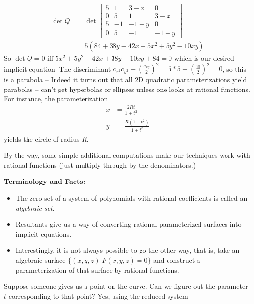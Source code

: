 \begin{numerical-example}
  \begin{align*}
    \det Q &= \det
             \begin{bmatrix}
               5 & 1 & 3 - x & 0 \\
               0 & 5 & 1 & 3-x \\
               5 & -1 & -1-y & 0 \\
               0 & 5 & -1 & -1-y
             \end{bmatrix} \\
    &= 5(84 + 38y - 42x + 5x^2 + 5y^2 - 10xy)
  \end{align*}
  So $\det Q = 0$ iff $5x^2 + 5y^2 - 42x + 38y - 10xy + 84 = 0$ which
  is our desired implicit equation. The discriminant $c_{x^2}c_{y^2} -
  (\frac{c_{xy}}{2})^2 = 5 * 5 - (\frac{10}{2})^2 = 0$, so this is a
  parabola -- Indeed it turns out that all $2$D quadratic
  parameterizations yield parabolas -- can't get hyperbolas or
  ellipses unless one looks at rational functions. For instance, the
  parameterization
  \begin{align*}
    x &= \frac{2Rt}{1+t^2} \\
    y  &= \frac{R(1-t^2)}{1+t^2}
  \end{align*}
  yields the circle of radius $R$.

  By the way, some simple additional computations make our techniques
  work with rational functions (just multiply through by the
  denominators.)


  \textbf{Terminology and Facts:}
  \begin{itemize}
  \item The zero set of a system of polynomials with rational
    coefficients is called an \textit{algebraic set}.
  \item Resultants give us a way of converting rational parameterized
    surfaces into implicit equations.
  \item Interestingly, it is not always possible to go the other way,
    that is, take an algebraic surface $\{(x, y, z) | F(x, y, z) =
    0\}$ and construct a parameterization of that surface by rational functions.
  \end{itemize}

  Suppose someone gives us a point on the curve. Can we figure out the
  parameter $t$ corresponding to that point? Yes, using the reduced
  system


\end{numerical-example}
